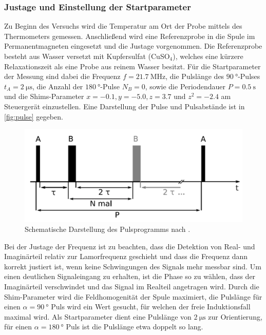 \subsubsection{Justage und Einstellung der Startparameter}
\noindent Zu Beginn des Versuchs wird die Temperatur am Ort der Probe mittels
des Thermometers gemessen. Anschließend wird eine Referenzprobe in die Spule im
Permanentmagneten eingesetzt und die Justage vorgenommen. Die Referenzprobe
besteht aus Wasser versetzt mit Kupfersulfat (CuSO$_4$), welches eine kürzere
Relaxationszeit als eine Probe aus reinem Wasser besitzt. Für die Startparameter
der Messung sind dabei die Frequenz $f = \SI{21.7}{\mega\hertz}$, die Pulslänge des $\SI{90}{\degree}$-Pulses $t_A =
\SI{2}{\micro\second}$, die Anzahl der $\SI{180}{\degree}$-Pulse $N_B = 0$, sowie die Periodendauer
$P = \SI{0.5}{\second}$ und die Shims-Parameter $x = -0.1, y = -5.0, z = 3.7$
und $z^2 = -2.4$ am Steuergerät einzustellen. Eine Darstellung der Pulse und
Pulsabstände ist in \autoref{fig:pulse} gegeben.
\begin{figure}
  \centering
  \includegraphics[scale=0.3]{resources/pulse.png}
  \caption{Schematische Darstellung des Pulsprogramms nach \cite{sample}.}
  \label{fig:pulse}
\end{figure}
Bei der Justage der Frequenz ist
zu beachten, dass die Detektion von Real- und Imaginärteil relativ zur
Lamorfrequenz geschieht und dass die Frequenz dann korrekt justiert ist, wenn
keine Schwingungen des Signals mehr messbar sind. Um einen deutlichen
Signaleingang zu erhalten, ist die Phase so zu wählen, dass der Imaginärteil
verschwindet und das Signal im Realteil angetragen wird. Durch die
Shim-Parameter wird die Feldhomogenität der Spule maximiert, die Pulslänge
für einen $\alpha = \SI{90}{\degree}$ Puls wird ein Wert gesucht, für welchen
der freie Induktionsfall maximal wird. Als Startparameter dient eine Pulslänge
von $\SI{2}{\micro\second}$ zur Orientierung, für einen $\alpha = \SI{180}{\degree}$ Puls
ist die Pulslänge etwa doppelt so lang. \\
